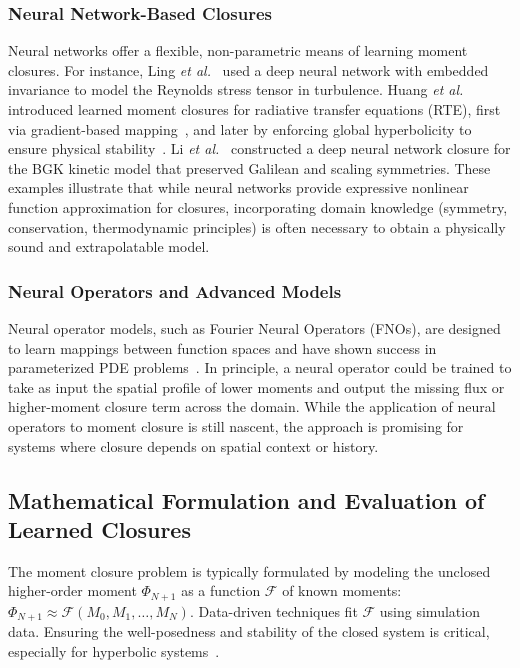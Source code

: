 \documentclass[journal, onecolumn]{IEEEtran}
\begin{document}
\subsubsection{Neural Network-Based Closures}

Neural networks offer a flexible, non-parametric means of learning moment closures. For instance, Ling \textit{et al.}~\cite{ling2016reynolds} used a deep neural network with embedded invariance to model the Reynolds stress tensor in turbulence. Huang \textit{et al.} introduced learned moment closures for radiative transfer equations (RTE), first via gradient-based mapping~\cite{huang2022mlRTE1}, and later by enforcing global hyperbolicity to ensure physical stability~\cite{huang2023mlRTE2}. Li \textit{et al.}~\cite{li2020fourier} constructed a deep neural network closure for the BGK kinetic model that preserved Galilean and scaling symmetries. These examples illustrate that while neural networks provide expressive nonlinear function approximation for closures, incorporating domain knowledge (symmetry, conservation, thermodynamic principles) is often necessary to obtain a physically sound and extrapolatable model.

\subsubsection{Neural Operators and Advanced Models}

Neural operator models, such as Fourier Neural Operators (FNOs), are designed to learn mappings between function spaces and have shown success in parameterized PDE problems~\cite{li2020fourier}. In principle, a neural operator could be trained to take as input the spatial profile of lower moments and output the missing flux or higher-moment closure term across the domain. While the application of neural operators to moment closure is still nascent, the approach is promising for systems where closure depends on spatial context or history.

\subsection{Mathematical Formulation and Evaluation of Learned Closures}

The moment closure problem is typically formulated by modeling the unclosed higher-order moment $\Phi_{N+1}$ as a function $\mathcal{F}$ of known moments: $\Phi_{N+1} \approx \mathcal{F}(M_0, M_1, \dots, M_N)$. Data-driven techniques fit $\mathcal{F}$ using simulation data. Ensuring the well-posedness and stability of the closed system is critical, especially for hyperbolic systems~\cite{huang2023mlRTE2}.
\end{document}
